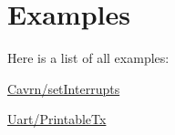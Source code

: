 \section{Examples}
Here is a list of all examples\-:\begin{DoxyCompactItemize}
\item 
\hyperlink{a00002}{Cavrn/set\-Interrupts}
\item 
\hyperlink{a00004}{Uart/\-Printable\-Tx}
\end{DoxyCompactItemize}
